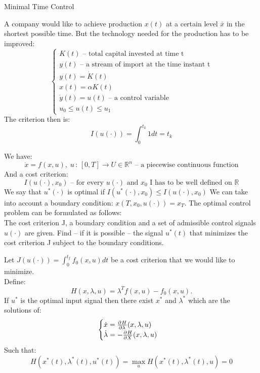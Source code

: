 \ex
{Minimal Time Control}
{
    A company would like to achieve production $x(t)$ at a certain level $\bar{x}$ in the shortest possible time.
    But the technology needed for the production has to be improved:
    \begin{equation}
        \begin{cases}
        K(t) \text{ -- total capital invested at time t}\\
        y(t) \text{ -- a stream of import at the time instant t}\\
        y(t) = \dot{K}(t)\\
        x(t) = \alpha K(t)\\
        \dot{y}(t) = u(t) \text{ -- a control variable}\\
        u_0 \le u(t) \le u_1
        \end{cases}
    \end{equation}
    The criterion then is:
    \begin{equation}
        I(u(\cdot)) = \int_0^{t_k}1dt=t_k
    \end{equation}

}


{
    We have:
    \begin{equation}
        \dot{x} = f(x,u),\; u\,:\,[0,T] \longrightarrow U \in \mathbb{R}^{n} \text{ -- a piecewise continuous function} 
    \end{equation}
    And a cost criterion:
    \begin{equation}
        I(u(\cdot),x_0) \text{ -- for every $u(\cdot)$ and  $x_0$ I has to be well defined on $\mathbb{R}$}
    \end{equation}
    We say that $u^{*}(\cdot)$ is optimal if $I(u^{*}(\cdot),x_0) \le I(u(\cdot),x_0)$
    We can take into account a boundary condition: $x(T,x_0,u(\cdot))=x_T$.
    The optimal control problem can be formulated as follows:\\
    The cost criterion J, a boundary condition and a set of admissible control signals $u(\cdot)$ are given.
    Find -- if it is possible -- the signal  $u^{*}(t)$ that minimizes the cost criterion J subject
    to the boundary conditions.
}

{
    Let $J(u(\cdot)) = \int^{t_f}_0 f_0(x,u)dt$ be a cost criterion that we would like to minimize.\\
    Define:
    \[
    H(x,\lambda,u) = \lambda^{T}f(x,u)-f_0(x,u)

    .\]
    If $u^{*}$ is the optimal input signal then there exist $x^{*}$ and $\lambda^{*}$ which are the solutions of:
    \begin{equation}
        \begin{cases}
            \dot{x} = \frac{\partial^{}H}{\partial\lambda^{}}(x,\lambda,u)\\
            \dot{\lambda} = - \frac{\partial^{}H}{\partial X^{}}(x,\lambda,u)
        \end{cases}
    \end{equation}
    Such that:
    \begin{equation}
        H(x^{*}(t),\lambda^{*}(t),u^{*}(t)) = \max_u{H(x^{*}(t),\lambda^{*}(t),u)} = 0
    \end{equation}
}

